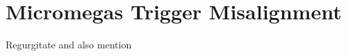 \chapter{Micromegas Trigger Misalignment}
\label{mmt}

Regurgitate \cite{misalnote} and also mention \cite{blcnote}
